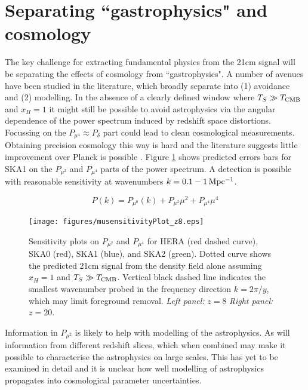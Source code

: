 \documentclass{PoS}
\begin{document}
\section{Separating ``gastrophysics" and cosmology}
\label{sec:separation}

The key challenge for extracting fundamental physics from the 21cm signal will be separating the effects of cosmology from ``gastrophysics". A number of avenues have been studied in the literature, which broadly separate into (1) avoidance and (2) modelling. In the absence of a clearly defined window where $T_S\gg T_{\rm CMB}$ and $x_H=1$ it might still be possible to avoid astrophysics via the angular dependence of the power spectrum induced by redshift space distortions. Focussing on the $P_{\mu^4}\approx P_\delta$ part could lead to clean cosmological measurements. Obtaining precision cosmology this way is hard and the literature suggests little improvement over Planck is possible \cite{2006ApJ...653..815M,2008PhRvD..78b3529M}. Figure \ref{fig:musensitivity} shows predicted errors bars for SKA1 on the $P_{\mu^2}$ and $P_{\mu^4}$ parts of the power spectrum. A detection is possible with reasonable sensitivity at wavenumbers $k=0.1-1{\rm\,Mpc^{-1}}$.

\begin{equation}
P(k)=P_{\mu^0}(k)+P_{\mu^2}\mu^2+P_{\mu^4}\mu^4
\end{equation}


\begin{figure}[htbp]
\begin{center}
\texttt{[image: figures/musensitivityPlot\_z8.eps]}
\caption{Sensitivity plots on $P_{\mu^2}$ and $P_{\mu^4}$ for HERA (red dashed curve), SKA0 (red), SKA1 (blue), and SKA2 (green). Dotted curve shows the predicted 21cm signal from the density field alone assuming $x_H=1$ and $T_S\gg T_{\rm CMB}$. Vertical black dashed line indicates the smallest wavenumber probed in the frequency direction $k=2\pi/y$, which may limit foreground removal.  {\em Left panel:} $z=8$ {\em Right panel:} $z=20$.}
\label{fig:musensitivity}
\end{center}
\end{figure}

Information in $P_{\mu^2}$ is likely to help with modelling of the astrophysics. As will information from different redshift slices, which when combined may make it possible to characterise the astrophysics on large scales. This has yet to be examined in detail and it is unclear how well modelling of astrophysics propagates into cosmological parameter uncertainties.
\end{document}
